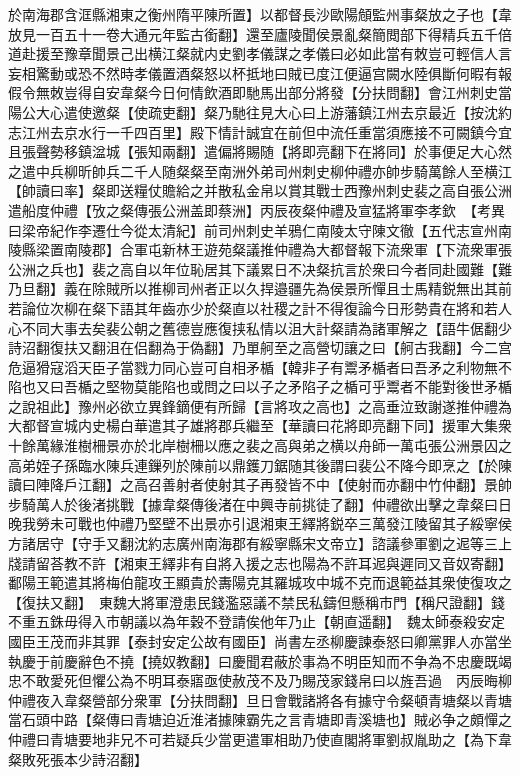 於南海郡含洭縣湘東之衡州隋平陳所置】以都督長沙歐陽頠監州事粲放之子也【韋放見一百五十一卷大通元年監古銜翻】還至廬陵聞侯景亂粲簡閲部下得精兵五千倍道赴援至豫章聞景己出横江粲就内史劉孝儀謀之孝儀曰必如此當有敇豈可輕信人言妄相驚動或恐不然時孝儀置酒粲怒以杯抵地曰賊已度江便逼宫闕水陸俱斷何暇有報假令無敇豈得自安韋粲今日何情飲酒即馳馬出部分將發【分扶問翻】會江州刺史當陽公大心遣使邀粲【使疏吏翻】粲乃馳往見大心曰上游藩鎮江州去京最近【按沈約志江州去京水行一千四百里】殿下情計誠宜在前但中流任重當須應接不可闕鎮今宜且張聲勢移鎮湓城【張知兩翻】遣偏將賜随【將即亮翻下在將同】於事便足大心然之遣中兵柳昕帥兵二千人随粲粲至南洲外弟司州刺史柳仲禮亦帥步騎萬餘人至横江【帥讀曰率】粲即送糧仗贍給之并散私金帛以賞其戰士西豫州刺史裴之高自張公洲遣船度仲禮【攷之粲傳張公洲盖即蔡洲】丙辰夜粲仲禮及宣猛將軍李孝欽　【考異曰梁帝紀作李遷仕今從太清紀】前司州刺史羊鴉仁南陵太守陳文徹【五代志宣州南陵縣梁置南陵郡】合軍屯新林王遊苑粲議推仲禮為大都督報下流衆軍【下流衆軍張公洲之兵也】裴之高自以年位恥居其下議累日不决粲抗言於衆曰今者同赴國難【難乃旦翻】義在除賊所以推柳司州者正以久捍邉疆先為侯景所憚且士馬精鋭無出其前若論位次柳在粲下語其年齒亦少於粲直以社稷之計不得復論今日形勢貴在將和若人心不同大事去矣裴公朝之舊德豈應復挟私情以沮大計粲請為諸軍解之【語牛倨翻少詩沼翻復扶又翻沮在侣翻為于偽翻】乃單舸至之高營切讓之曰【舸古我翻】今二宫危逼猾寇滔天臣子當戮力同心豈可自相矛楯【韓非子有鬻矛楯者曰吾矛之利物無不陷也又曰吾楯之堅物莫能陷也或問之曰以子之矛陷子之楯可乎鬻者不能對後世矛楯之說祖此】豫州必欲立異鋒鏑便有所歸【言將攻之高也】之高垂泣致謝遂推仲禮為大都督宣城内史楊白華遣其子雄將郡兵繼至【華讀曰花將即亮翻下同】援軍大集衆十餘萬緣淮樹柵景亦於北岸樹柵以應之裴之高與弟之横以舟師一萬屯張公洲景囚之高弟姪子孫臨水陳兵連鏁列於陳前以鼎鑊刀鋸随其後謂曰裴公不降今即烹之【於陳讀曰陣降戶江翻】之高召善射者使射其子再發皆不中【使射而亦翻中竹仲翻】景帥步騎萬人於後渚挑戰【據韋粲傳後渚在中興寺前挑徒了翻】仲禮欲出擊之韋粲曰日晚我勞未可戰也仲禮乃堅壁不出景亦引退湘東王繹將鋭卒三萬發江陵留其子綏寧侯方諸居守【守手又翻沈約志廣州南海郡有綏寧縣宋文帝立】諮議參軍劉之迡等三上牋請留荅教不許【湘東王繹非有自將入援之志也陽為不許耳迡與遲同又音奴寄翻】鄱陽王範遣其將梅伯龍攻王顯貴於夀陽克其羅城攻中城不克而退範益其衆使復攻之【復扶又翻】　東魏大將軍澄患民錢濫惡議不禁民私鑄但懸稱市門【稱尺證翻】錢不重五銖毋得入市朝議以為年穀不登請俟他年乃止【朝直遥翻】　魏太師泰殺安定國臣王茂而非其罪【泰封安定公故有國臣】尚書左丞柳慶諫泰怒曰卿黨罪人亦當坐執慶于前慶辭色不撓【撓奴教翻】曰慶聞君蔽於事為不明臣知而不争為不忠慶既竭忠不敢愛死但懼公為不明耳泰寤亟使赦茂不及乃賜茂家錢帛曰以旌吾過　丙辰晦柳仲禮夜入韋粲營部分衆軍【分扶問翻】旦日會戰諸將各有據守令粲頓青塘粲以青塘當石頭中路【粲傳曰青塘迫近淮渚據陳霸先之言青塘即青溪塘也】賊必争之頗憚之仲禮曰青塘要地非兄不可若疑兵少當更遣軍相助乃使直閣將軍劉叔胤助之【為下韋粲敗死張本少詩沼翻】

